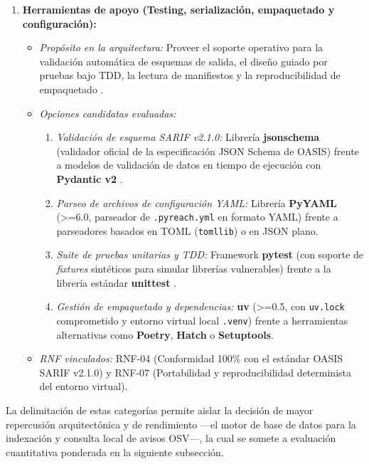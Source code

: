 \begin{enumerate}
    \item \textbf{Herramientas de apoyo (Testing, serialización, empaquetado y configuración):}
    \begin{itemize}
        \item \textit{Propósito en la arquitectura:} Proveer el soporte operativo para la validación automática de esquemas de salida, el diseño guiado por pruebas bajo TDD, la lectura de manifiestos y la reproducibilidad de empaquetado \cite{myers2011art, oasis2019sarif}.
        \item \textit{Opciones candidatas evaluadas:}
        \begin{enumerate}[label=\alph*)]
            \item \textit{Validación de esquema SARIF v2.1.0:} Librería \textbf{jsonschema} (validador oficial de la especificación JSON Schema de OASIS) frente a modelos de validación de datos en tiempo de ejecución con \textbf{Pydantic v2} \cite{oasis2019sarif}.
            \item \textit{Parseo de archivos de configuración YAML:} Librería \textbf{PyYAML} (>=6.0, parseador de \texttt{.\allowbreak pyreach.\allowbreak yml} en formato YAML) frente a parseadores basados en TOML (\texttt{tomllib}) o en JSON plano.
            \item \textit{Suite de pruebas unitarias y TDD:} Framework \textbf{pytest} (con soporte de \textit{fixtures} sintéticos para simular librerías vulnerables) frente a la librería estándar \textbf{unittest} \cite{myers2011art}.
            \item \textit{Gestión de empaquetado y dependencias:} \textbf{uv} (>=0.5, con \texttt{uv.\allowbreak lock} comprometido y entorno virtual local \texttt{.\allowbreak venv}) frente a herramientas alternativas como \textbf{Poetry}, \textbf{Hatch} o \textbf{Setuptools}.
        \end{enumerate}
        \item \textit{RNF vinculados:} RNF-04 (Conformidad 100\% con el estándar OASIS SARIF v2.1.0) y RNF-07 (Portabilidad y reproducibilidad determinista del entorno virtual).
    \end{itemize}
\end{enumerate}

La delimitación de estas categorías permite aislar la decisión de mayor repercusión arquitectónica y de rendimiento ---el motor de base de datos para la indexación y consulta local de avisos OSV---, la cual se somete a evaluación cuantitativa ponderada en la siguiente subsección.

